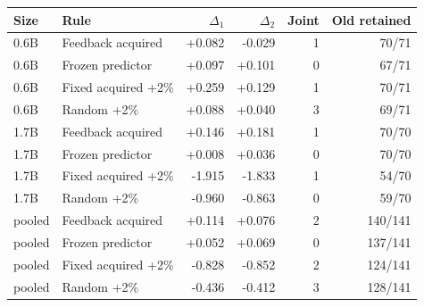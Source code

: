 \begin{tabular}{llrrrr}\toprule
Size & Rule & $\Delta_1$ & $\Delta_2$ & Joint & Old retained\\\midrule
0.6B & Feedback acquired & +0.082 & -0.029 & 1 & 70/71\\
0.6B & Frozen predictor & +0.097 & +0.101 & 0 & 67/71\\
0.6B & Fixed acquired +2\% & +0.259 & +0.129 & 1 & 70/71\\
0.6B & Random +2\% & +0.088 & +0.040 & 3 & 69/71\\
1.7B & Feedback acquired & +0.146 & +0.181 & 1 & 70/70\\
1.7B & Frozen predictor & +0.008 & +0.036 & 0 & 70/70\\
1.7B & Fixed acquired +2\% & -1.915 & -1.833 & 1 & 54/70\\
1.7B & Random +2\% & -0.960 & -0.863 & 0 & 59/70\\
pooled & Feedback acquired & +0.114 & +0.076 & 2 & 140/141\\
pooled & Frozen predictor & +0.052 & +0.069 & 0 & 137/141\\
pooled & Fixed acquired +2\% & -0.828 & -0.852 & 2 & 124/141\\
pooled & Random +2\% & -0.436 & -0.412 & 3 & 128/141\\
\bottomrule\end{tabular}
